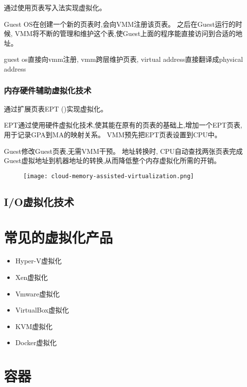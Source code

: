 通过使用页表写入法实现虚拟化。

Guest OS在创建一个新的页表时,会向VMM注册该页表。 之后在Guest运行的时候, VMM将不断的管理和维护这个表,使Guest上面的程序能直接访问到合适的地址。 

guest os直接向vmm注册, vmm跨层维护页表, virtual address直接翻译成physical address

\subsubsection{内存硬件辅助虚拟化技术}

通过扩展页表EPT ()实现虚拟化。 

EPT通过使用硬件虚拟化技术,使其能在原有的页表的基础上,增加一个EPT页表,用于记录GPA到MA的映射关系。 VMM预先把EPT页表设置到CPU中。 

Guest修改Guest页表,无需VMM干预。 地址转换时, CPU自动查找两张页表完成Guest虚拟地址到机器地址的转换,从而降低整个内存虚拟化所需的开销。 

\begin{figure}[htbp]
    \begin{center}
        \texttt{[image: cloud-memory-assisted-virtualization.png]}
    \end{center}
\end{figure}

\subsection{I/O虚拟化技术}


\section{常见的虚拟化产品}

\begin{itemize}
    \item Hyper-V虚拟化
    \item Xen虚拟化
    \item Vmware虚拟化
    \item VirtualBox虚拟化
    \item KVM虚拟化
    \item Docker虚拟化
\end{itemize}


\section{容器}

